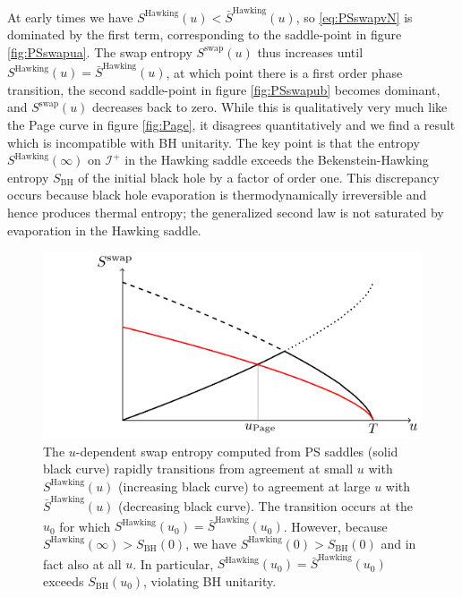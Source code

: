 \documentclass[letterpaper,12pt]{article}
\newcommand*{\scri}{\mathscr{I}} %
\begin{document}
At early times we have $S^\text{Hawking}(u) < \bar{S}^\text{Hawking}(u)$, so \eqref{eq:PSswapvN} is dominated by the first term, corresponding to the saddle-point in figure \ref{fig:PSswapua}.  The swap entropy $S^\text{swap}(u)$ thus increases until $S^\text{Hawking}(u) = \bar S^\text{Hawking}(u)$, at which point there is a first order phase  transition, the second saddle-point in figure \ref{fig:PSswapub} becomes dominant, and $S^\text{swap}(u)$ decreases back to zero. While this is qualitatively very much like the Page curve in figure \ref{fig:Page}, it disagrees quantitatively and we find a result which is incompatible with BH unitarity. The key point is that the entropy $S^\text{Hawking}(\infty)$ on $\scri^+$ in the Hawking saddle exceeds the Bekenstein-Hawking entropy $S_{\text{BH}}$ of the initial black hole by a factor of order one.  This discrepancy occurs because black hole evaporation is thermodynamically irreversible and hence produces thermal entropy; the generalized second law is not saturated by evaporation in the Hawking saddle.

\begin{figure}
	\centering
	\includegraphics[width=.6\textwidth]{NotPageCurve}
	\caption{The $u$-dependent swap entropy computed from PS saddles (solid black curve) rapidly transitions from agreement at small $u$  with $S^\text{Hawking}(u)$ (increasing black curve) to agreement at large $u$ with $\bar S^\text{Hawking}(u)$ (decreasing black curve).
The transition occurs at the $u_0$ for which $S^\text{Hawking}(u_0) = \bar S^\text{Hawking}(u_0)$.  However, because $S^\text{Hawking}(\infty) > S_\text{BH}(0)$, we have  $S^\text{Hawking}(0) > S_\text{BH}(0)$ and in fact also at all $u$.  In particular, $S^\text{Hawking}(u_0) = \bar S^\text{Hawking}(u_0)$ exceeds $S_\text{BH}(u_0)$, violating BH unitarity. \label{fig:splot}}
\end{figure}
\end{document}

